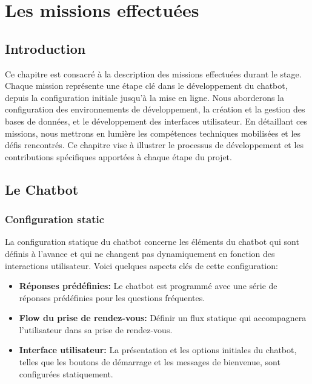 \chapter{Les missions effectuées}
\label{chap:Chapter 4 title}
\section*{Introduction}

\hspace{16pt}Ce chapitre est consacré à la description des missions effectuées durant le stage. Chaque mission représente une étape clé dans le développement du chatbot, depuis la configuration initiale jusqu'à la mise en ligne. Nous aborderons la configuration des environnements de développement, la création et la gestion des bases de données, et le développement des interfaces utilisateur. En détaillant ces missions, nous mettrons en lumière les compétences techniques mobilisées et les défis rencontrés. Ce chapitre vise à illustrer le processus de développement et les contributions spécifiques apportées à chaque étape du projet.

\pagebreak

\section{Le Chatbot}

\subsection{Configuration static}

\hspace{16pt}La configuration statique du chatbot concerne les éléments du chatbot qui sont définis à l'avance et qui ne changent pas dynamiquement en fonction des interactions utilisateur. Voici quelques aspects clés de cette configuration:

\begin{itemize}
  \item \textbf{Réponses prédéfinies: }Le chatbot est programmé avec une série de réponses prédéfinies pour les questions fréquentes.
  \item \textbf{Flow du prise de rendez-vous: }Définir un flux statique qui accompagnera l'utilisateur dans sa prise de rendez-vous.
  \item \textbf{Interface utilisateur: }La présentation et les options initiales du chatbot, telles que les boutons de démarrage et les messages de bienvenue, sont configurées statiquement.
\end{itemize}

